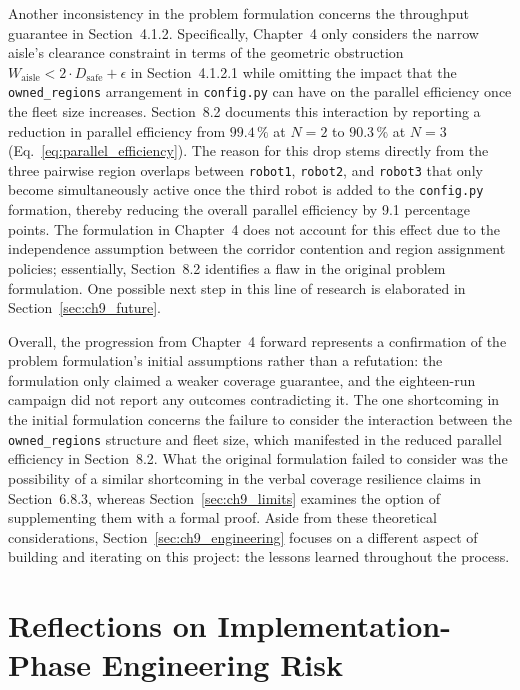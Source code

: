 Another inconsistency in the problem formulation concerns the throughput guarantee in Section~4.1.2. Specifically, Chapter~4 only considers the narrow aisle's clearance constraint in terms of the geometric obstruction $W_{\text{aisle}} < 2 \cdot D_{\text{safe}} + \epsilon$ in Section~4.1.2.1 while omitting the impact that the \texttt{owned\_regions} arrangement in \texttt{config.py} can have on the parallel efficiency once the fleet size increases. Section~8.2 documents this interaction by reporting a reduction in parallel efficiency from $99.4\,\%$ at $N=2$ to $90.3\,\%$ at $N=3$ (Eq.~\eqref{eq:parallel_efficiency}). The reason for this drop stems directly from the three pairwise region overlaps between \texttt{robot1}, \texttt{robot2}, and \texttt{robot3} that only become simultaneously active once the third robot is added to the \texttt{config.py} formation, thereby reducing the overall parallel efficiency by 9.1 percentage points. The formulation in Chapter~4 does not account for this effect due to the independence assumption between the corridor contention and region assignment policies; essentially, Section~8.2 identifies a flaw in the original problem formulation. One possible next step in this line of research is elaborated in Section~\ref{sec:ch9_future}.

Overall, the progression from Chapter~4 forward represents a confirmation of the problem formulation's initial assumptions rather than a refutation: the formulation only claimed a weaker coverage guarantee, and the eighteen-run campaign did not report any outcomes contradicting it. The one shortcoming in the initial formulation concerns the failure to consider the interaction between the \texttt{owned\_regions} structure and fleet size, which manifested in the reduced parallel efficiency in Section~8.2. What the original formulation failed to consider was the possibility of a similar shortcoming in the verbal coverage resilience claims in Section~6.8.3, whereas Section~\ref{sec:ch9_limits} examines the option of supplementing them with a formal proof. Aside from these theoretical considerations, Section~\ref{sec:ch9_engineering} focuses on a different aspect of building and iterating on this project: the lessons learned throughout the process.

\section{Reflections on Implementation-Phase Engineering Risk\label{sec:ch9_engineering}}

